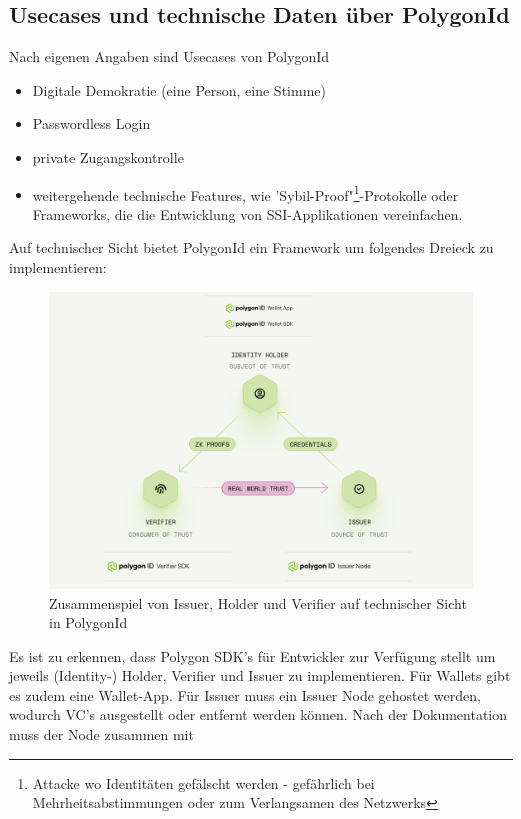 \subsection{Usecases und technische Daten über PolygonId}
\label{technischeDatenPolygon}
Nach eigenen Angaben sind Usecases von PolygonId
\begin{itemize}
	\item Digitale Demokratie (eine Person, eine Stimme)
	\item Passwordless Login
	\item private Zugangskontrolle
	\item weitergehende technische Features, wie 'Sybil-Proof"\footnote{Attacke wo Identitäten gefälscht werden - gefährlich bei Mehrheitsabstimmungen oder zum Verlangsamen des Netzwerks}-Protokolle oder Frameworks, die die Entwicklung von SSI-Applikationen vereinfachen.
\end{itemize}
\newpage
Auf technischer Sicht bietet PolygonId ein Framework um folgendes Dreieck zu implementieren:
\begin{figure}[H]
	\centering
	\includegraphics[scale=0.3]{media/polygonIddreieck_inv.png}
	\caption{Zusammenspiel von Issuer, Holder und Verifier auf technischer Sicht in PolygonId \cite{ID31}}
	\label{fig:meine-grafik}
\end{figure}

Es ist zu erkennen, dass Polygon SDK's für Entwickler zur Verfügung stellt um jeweils (Identity-) Holder, Verifier und Issuer zu implementieren. Für Wallets gibt es zudem eine Wallet-App. Für Issuer muss ein Issuer Node gehostet werden, wodurch VC's ausgestellt oder entfernt werden können. Nach der Dokumentation \cite{ID38} muss der Node zusammen mit 

